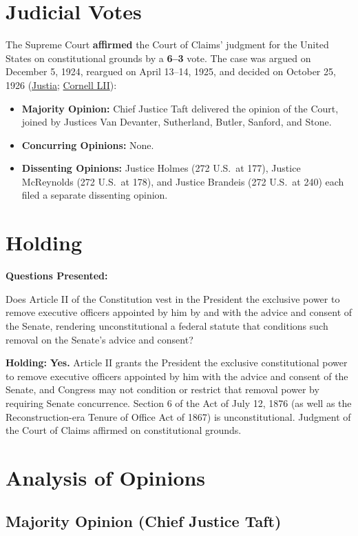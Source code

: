 \documentclass[12pt]{article}
\begin{document}
\section{Judicial Votes}
The Supreme Court \textbf{affirmed} the Court of Claims' judgment for the United States on constitutional grounds by a \textbf{6--3} vote. The case was argued on December 5, 1924, reargued on April 13--14, 1925, and decided on October 25, 1926 (\href{https://supreme.justia.com/cases/federal/us/272/52/}{Justia}; \href{https://www.law.cornell.edu/supremecourt/text/272/52}{Cornell LII}):

\begin{itemize}
    \item \textbf{Majority Opinion:} Chief Justice Taft delivered the opinion of the Court, joined by Justices Van Devanter, Sutherland, Butler, Sanford, and Stone.
    \item \textbf{Concurring Opinions:} None.
    \item \textbf{Dissenting Opinions:} Justice Holmes (272 U.S.\ at 177), Justice McReynolds (272 U.S.\ at 178), and Justice Brandeis (272 U.S.\ at 240) each filed a separate dissenting opinion.
\end{itemize}

\section{Holding}
\textbf{Questions Presented:}

Does Article II of the Constitution vest in the President the exclusive power to remove executive officers appointed by him by and with the advice and consent of the Senate, rendering unconstitutional a federal statute that conditions such removal on the Senate's advice and consent?

\textbf{Holding:} \textbf{Yes.} Article II grants the President the exclusive constitutional power to remove executive officers appointed by him with the advice and consent of the Senate, and Congress may not condition or restrict that removal power by requiring Senate concurrence. Section 6 of the Act of July 12, 1876 (as well as the Reconstruction-era Tenure of Office Act of 1867) is unconstitutional. Judgment of the Court of Claims affirmed on constitutional grounds.

\section{Analysis of Opinions}
\subsection{Majority Opinion (Chief Justice Taft)}
\end{document}
